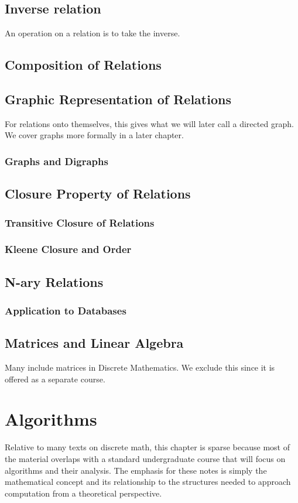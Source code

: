 \documentclass[11pt]{book} %
\theoremstyle {definition}
\theoremstyle {remark}
\begin{document}
\section {Inverse relation}
An operation on a relation is to take the inverse.

\section {Composition of Relations}


\section {Graphic Representation of Relations}
For relations onto themselves, this gives what we will later call a directed graph. We cover graphs more formally in a later chapter.
    \subsection {Graphs and Digraphs}

\section {Closure Property of Relations}
   \subsection {Transitive Closure of Relations}
   \subsection {Kleene Closure and Order}

\section {N-ary Relations}
    \subsection {Application to Databases}

\section {Matrices and Linear Algebra}
Many include matrices in Discrete Mathematics. We exclude this since it is offered as a separate course.
\newpage


\chapter {Algorithms}
Relative to many texts on discrete math, this chapter is sparse because most of the material overlaps with a standard undergraduate course that will focus on algorithms and their analysis. The emphasis for these notes is simply the mathematical concept and its relationship to the structures needed to approach computation from a theoretical perspective.
\end{document}
